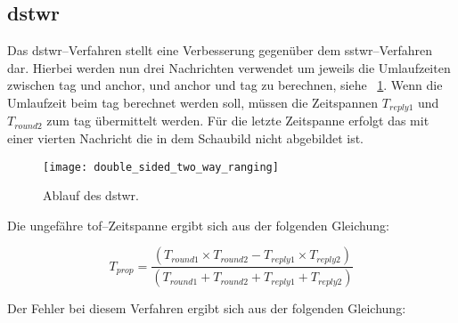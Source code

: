 \begin{comment}
------------------------------------------------------------------------------------------
- \cite{decawave2016dw1kusermanual}
	- Where the clock in device A runs at ka times the desired frequency and the clock in device B runs at kb times the desired frequency and both ka & kb are close to 1.
	- To give some idea of the size of this error, if devices A and B have clocks where each are 20 ppm away (the worst case specification) from the nominal clock in directions which make their combined error additive and equal to 40 ppm, then ka and kb might both be 0.99998 or 1.00002.
	- Even with a relatively large UWB operating range of say 100 m, the TOF is just 333 ns, so the error is 20 × 10-6 × 333 × 10-9 seconds, which is 6.7 × 10-12 seconds or 6.7 picoseconds which is approximately 2.2 mm.
\end{comment}
\subsection{\acrlong{dstwr}}\label{subsec:double_sided_two_way_ranging}

Das \Gls{dstwr}--Verfahren stellt eine Verbesserung gegenüber dem \Gls{sstwr}--Verfahren dar. Hierbei werden nun drei Nachrichten verwendet um jeweils die Umlaufzeiten zwischen \Gls{tag} und \Gls{anchor}, und \Gls{anchor} und \Gls{tag} zu berechnen, siehe \figurename~\ref{fig:double_sided_two_way_ranging}. Wenn die Umlaufzeit beim \Gls{tag} berechnet werden soll, müssen die Zeitspannen $T_{reply1}$ und $T_{round2}$ zum \Gls{tag} übermittelt werden. Für die letzte Zeitspanne erfolgt das mit einer vierten Nachricht die in dem Schaubild nicht abgebildet ist. \cite{decawave2015twr, decawave2016dw1kusermanual}

\begin{figure}[ht]
	\centering
	\texttt{[image: double\_sided\_two\_way\_ranging]}
	\caption{Ablauf des \acrlong{dstwr}.}
	\label{fig:double_sided_two_way_ranging}
\end{figure}

Die ungefähre \Gls{tof}--Zeitspanne ergibt sich aus der folgenden Gleichung:

\[T_{prop}=\frac{\left(T_{round1}\times T_{round2}-T_{reply1}\times T_{reply2}\right)}{\left(T_{round1}+T_{round2}+T_{reply1}+T_{reply2}\right)}\]

Der Fehler bei diesem Verfahren ergibt sich aus der folgenden Gleichung:

